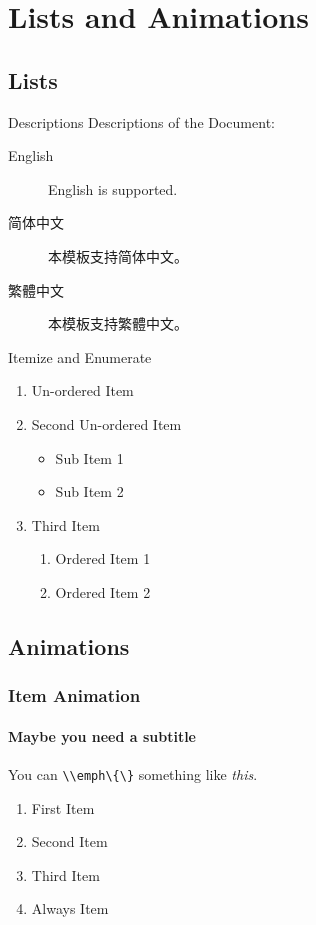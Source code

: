 \section{Lists and Animations}

\subsection{Lists}


\begin{frame}{Descriptions}
    Descriptions of the Document:
    \bigskip
\begin{description}
    \item[English] English is supported.
    \item[简体中文] 本模板支持简体中文。
    \item[繁體中文] 本模板支持繁體中文。
\end{description}
\end{frame}


\begin{frame}{Itemize and Enumerate}
\begin{enumerate}
    \item Un-ordered Item
    \item Second Un-ordered Item
        \begin{itemize}
            \item Sub Item 1
            \item Sub Item 2
        \end{itemize}
    \item Third Item
    \begin{enumerate}
        \item Ordered Item 1
        \item Ordered Item 2
    \end{enumerate}
\end{enumerate}
\end{frame}


\subsection{Animations}


\begin{frame}
\frametitle{Item Animation}
\framesubtitle{Maybe you need a subtitle}
You can \lstinline|\\emph\{\}| something like \emph{this}.
\vfill
\begin{enumerate}
    \item<1-> First Item
    \item<2-> Second Item
    \item<3-> Third Item
    \item Always Item
\end{enumerate}

\bigskip

\end{frame}
